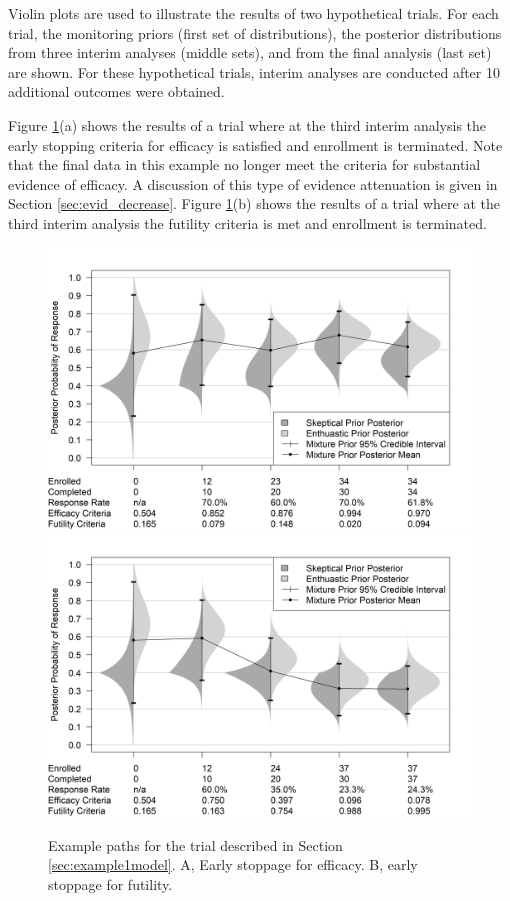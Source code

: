 \documentclass[useAMS,usenatbib,referee]{biom}
\begin{document}
Violin plots are used to illustrate the results of two hypothetical trials.
For each trial, the monitoring priors (first set of distributions), the posterior distributions from three interim analyses (middle sets), and from the final analysis (last set) are shown.
For these hypothetical trials, interim analyses are conducted after 10 additional outcomes were obtained. 

Figure \ref{fig:figure2}(a) shows the results of a trial where at the third interim analysis the early stopping criteria for efficacy is 
satisfied and enrollment is terminated. 
Note that the final data in this example no longer meet the criteria for substantial evidence of efficacy.
A discussion of this type of evidence attenuation is given in Section \ref{sec:evid_decrease}.
%
Figure \ref{fig:figure2}(b) shows the results of a trial where at the third interim analysis the futility criteria is met and enrollment is terminated. 

\begin{figure}\begin{center}
    \includegraphics[width=6in]{figure2a.png}
    \includegraphics[width=6in]{figure2b.png}
    \caption{Example paths for the trial described in Section \ref{sec:example1model}. A, Early stoppage for efficacy. B, early stoppage for futility.}
	\label{fig:figure2}
\end{center}
\end{figure}
\end{document}
